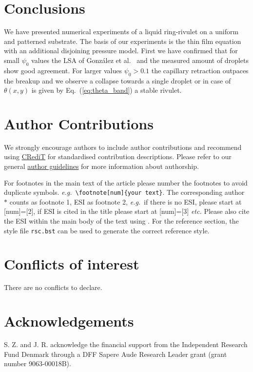 \documentclass[twoside,twocolumn,9pt]{article}
\begin{document}
\section{Conclusions}\label{sec:conclu}
We have presented numerical experiments of a liquid ring-rivulet on a uniform and patterned substrate. 
The basis of our experiments is the thin film equation with an additional disjoining pressure model.
First we have confirmed that for small $\psi_0$ values the LSA of Gonz{\'a}lez et al.~\cite{gonzalezStabilityLiquidRing2013} and the measured amount of droplets show good agreement.
For larger values $\psi_0 > 0.1$ the capillary retraction outpaces the breakup and we observe a collapse towards a single droplet or in case of $\theta(x,y)$ is given by Eq.~(\ref{eq:theta_band}) a stable rivulet.



\section*{Author Contributions}
We strongly encourage authors to include author contributions and recommend using \href{https://casrai.org/credit/}{CRediT} for standardised contribution descriptions. Please refer to our general \href{https://www.rsc.org/journals-books-databases/journal-authors-reviewers/author-responsibilities/}{author guidelines} for more information about authorship.

For footnotes in the main text of the article please number the footnotes to avoid duplicate symbols. \textit{e.g.}\ \texttt{\textbackslash footnote[num]\{your text\}}. The corresponding author $\ast$ counts as footnote 1, ESI as footnote 2, \textit{e.g.}\ if there is no ESI, please start at [num]=[2], if ESI is cited in the title please start at [num]=[3] \textit{etc.} Please also cite the ESI within the main body of the text using \dag. For the reference section, the style file \texttt{rsc.bst} can be used to generate the correct reference style.

\section*{Conflicts of interest}
There are no conflicts to declare.

\section*{Acknowledgements}
S. Z. and J. R. acknowledge the financial support from the Independent Research Fund Denmark through a DFF Sapere Aude Research Leader grant (grant number 9063-00018B).
\end{document}
